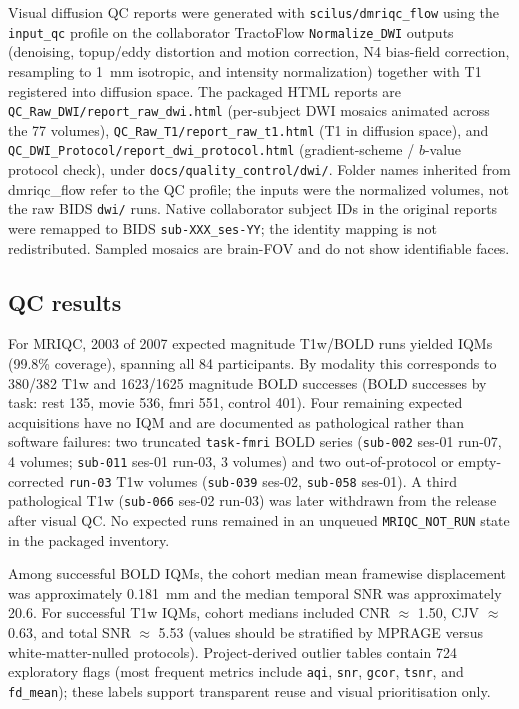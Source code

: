 Visual diffusion QC reports were generated with \texttt{scilus/dmriqc\_flow} using the \texttt{input\_qc} profile on the collaborator TractoFlow \texttt{Normalize\_DWI} outputs (denoising, topup/eddy distortion and motion correction, N4 bias-field correction, resampling to 1~mm isotropic, and intensity normalization) together with T1 registered into diffusion space. The packaged HTML reports are \texttt{QC\_Raw\_DWI/report\_raw\_dwi.html} (per-subject DWI mosaics animated across the 77 volumes), \texttt{QC\_Raw\_T1/report\_raw\_t1.html} (T1 in diffusion space), and \texttt{QC\_DWI\_Protocol/report\_dwi\_protocol.html} (gradient-scheme / $b$-value protocol check), under \texttt{docs/quality\_control/dwi/}. Folder names inherited from dmriqc\_flow refer to the QC profile; the inputs were the normalized volumes, not the raw BIDS \texttt{dwi/} runs. Native collaborator subject IDs in the original reports were remapped to BIDS \texttt{sub-XXX\_ses-YY}; the identity mapping is not redistributed. Sampled mosaics are brain-FOV and do not show identifiable faces.

\subsection{QC results}

For MRIQC, 2003 of 2007 expected magnitude T1w/BOLD runs yielded IQMs (99.8\% coverage), spanning all 84 participants. By modality this corresponds to 380/382 T1w and 1623/1625 magnitude BOLD successes (BOLD successes by task: rest 135, movie 536, fmri 551, control 401). Four remaining expected acquisitions have no IQM and are documented as pathological rather than software failures: two truncated \texttt{task-fmri} BOLD series (\texttt{sub-002} ses-01 run-07, 4 volumes; \texttt{sub-011} ses-01 run-03, 3 volumes) and two out-of-protocol or empty-corrected \texttt{run-03} T1w volumes (\texttt{sub-039} ses-02, \texttt{sub-058} ses-01). A third pathological T1w (\texttt{sub-066} ses-02 run-03) was later withdrawn from the release after visual QC. No expected runs remained in an unqueued \texttt{MRIQC\_NOT\_RUN} state in the packaged inventory.

Among successful BOLD IQMs, the cohort median mean framewise displacement was approximately 0.181~mm and the median temporal SNR was approximately 20.6. For successful T1w IQMs, cohort medians included CNR $\approx$ 1.50, CJV $\approx$ 0.63, and total SNR $\approx$ 5.53 (values should be stratified by MPRAGE versus white-matter-nulled protocols). Project-derived outlier tables contain 724 exploratory flags (most frequent metrics include \texttt{aqi}, \texttt{snr}, \texttt{gcor}, \texttt{tsnr}, and \texttt{fd\_mean}); these labels support transparent reuse and visual prioritisation only.

